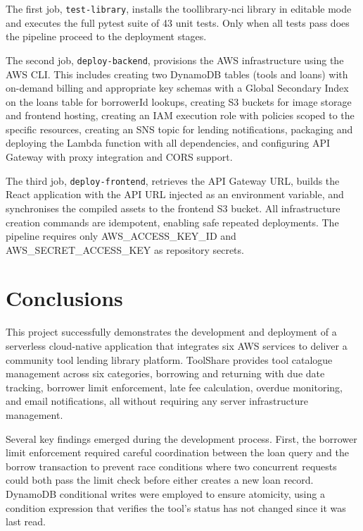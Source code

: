 \documentclass[conference]{IEEEtran}
\begin{document}
The first job, \texttt{test-library}, installs the toollibrary-nci library in editable mode and executes the full pytest suite of 43 unit tests. Only when all tests pass does the pipeline proceed to the deployment stages.

The second job, \texttt{deploy-backend}, provisions the AWS infrastructure using the AWS CLI. This includes creating two DynamoDB tables (tools and loans) with on-demand billing and appropriate key schemas with a Global Secondary Index on the loans table for borrowerId lookups, creating S3 buckets for image storage and frontend hosting, creating an IAM execution role with policies scoped to the specific resources, creating an SNS topic for lending notifications, packaging and deploying the Lambda function with all dependencies, and configuring API Gateway with proxy integration and CORS support.

The third job, \texttt{deploy-frontend}, retrieves the API Gateway URL, builds the React application with the API URL injected as an environment variable, and synchronises the compiled assets to the frontend S3 bucket. All infrastructure creation commands are idempotent, enabling safe repeated deployments. The pipeline requires only AWS\_ACCESS\_KEY\_ID and AWS\_SECRET\_ACCESS\_KEY as repository secrets.

\section{Conclusions}

This project successfully demonstrates the development and deployment of a serverless cloud-native application that integrates six AWS services to deliver a community tool lending library platform. ToolShare provides tool catalogue management across six categories, borrowing and returning with due date tracking, borrower limit enforcement, late fee calculation, overdue monitoring, and email notifications, all without requiring any server infrastructure management.

Several key findings emerged during the development process. First, the borrower limit enforcement required careful coordination between the loan query and the borrow transaction to prevent race conditions where two concurrent requests could both pass the limit check before either creates a new loan record. DynamoDB conditional writes were employed to ensure atomicity, using a condition expression that verifies the tool's status has not changed since it was last read.
\end{document}
